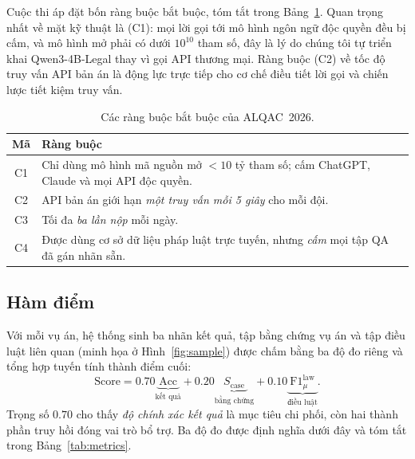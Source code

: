 \documentclass[conference]{IEEEtran}
\begin{document}
Cuộc thi áp đặt bốn ràng buộc bắt buộc, tóm tắt trong Bảng~\ref{tab:constraints}.
Quan trọng nhất về mặt kỹ thuật là (C1): mọi lời gọi tới mô hình ngôn ngữ độc
quyền đều bị cấm, và mô hình mở phải có dưới $10^{10}$ tham số, đây là lý do
chúng tôi tự triển khai \textsf{Qwen3-4B-Legal} thay vì gọi API thương mại.
Ràng buộc (C2) về tốc độ truy vấn API bản án là động lực trực tiếp cho cơ chế
điều tiết lời gọi và chiến lược tiết kiệm truy vấn.

\begin{table}[t]
  \centering
  \caption{Các ràng buộc bắt buộc của ALQAC~2026.}
  \label{tab:constraints}
  \footnotesize
  \begin{tabular}{@{}c p{}@{}}
    \toprule
    \textbf{Mã} & \textbf{Ràng buộc} \\
    \midrule
    C1 & Chỉ dùng mô hình mã nguồn mở $<10$ tỷ tham số; cấm ChatGPT, Claude và mọi API độc quyền. \\
    C2 & API bản án giới hạn \emph{một truy vấn mỗi 5 giây} cho mỗi đội. \\
    C3 & Tối đa \emph{ba lần nộp} mỗi ngày. \\
    C4 & Được dùng cơ sở dữ liệu pháp luật trực tuyến, nhưng \emph{cấm} mọi tập QA đã gán nhãn sẵn. \\
    \bottomrule
  \end{tabular}
\end{table}

\subsection{Hàm điểm}
\label{subsec:metrics}

Với mỗi vụ án, hệ thống sinh ba nhãn kết quả, tập bằng chứng vụ án và
tập điều luật liên quan (minh họa ở Hình~\ref{fig:sample}) được chấm bằng ba
độ đo riêng và tổng hợp tuyến tính thành điểm cuối:
\begin{equation}
  \mathrm{Score}
  = 0.70\underbrace{\,\mathrm{Acc}\,}_{\text{kết quả}}
  + 0.20\underbrace{\,S_{\text{case}}\,}_{\text{bằng chứng}}
  + 0.10\underbrace{\,\mathrm{F1}^{\text{law}}_{\mu}\,}_{\text{điều luật}}.
  \label{eq:final}
\end{equation}
Trọng số $0.70$ cho thấy \emph{độ chính xác kết quả} là mục tiêu chi phối, còn
hai thành phần truy hồi đóng vai trò bổ trợ. Ba độ đo được định nghĩa dưới đây
và tóm tắt trong Bảng~\ref{tab:metrics}.
\end{document}
